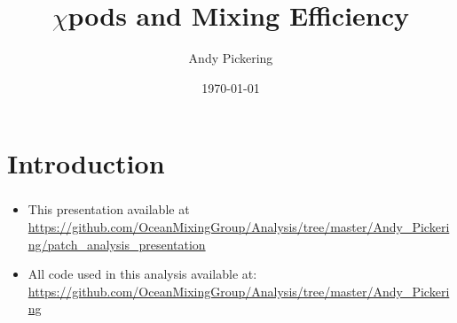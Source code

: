 \documentclass{beamer}
\title{$\chi$pods and Mixing Efficiency}
\author{Andy Pickering}
\date{\today}
\begin{document}
\frame{\titlepage}

\section[Outline]{}
\frame{\tableofcontents}


\section{Introduction}


\begin{frame}
 \frametitle{}

   \begin{itemize}
  \item This presentation available at \url{https://github.com/OceanMixingGroup/Analysis/tree/master/Andy_Pickering/patch_analysis_presentation}
  \item All code used in this analysis available at: \url{https://github.com/OceanMixingGroup/Analysis/tree/master/Andy_Pickering}
  \end{itemize}

\end{frame}
\end{document}
